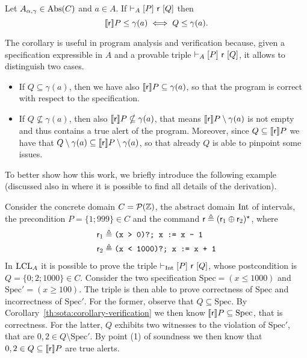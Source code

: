 \begin{corollary}\label{th:sota:corollary-verification}
	Let $A_{\alpha, \gamma} \in \text{\normalfont Abs}(C)$ and $a \in A$. If $\vdash_{A}\nobreak[P]~\mathsf{r}~[Q]$ then
	\[
	\llbracket\mathsf{r}\rrbracket P \le \gamma(a) \iff Q \le \gamma(a) .
	\]
\end{corollary}
The corollary is useful in program analysis and verification because, given a specification expressible in $A$ and a provable triple $\vdash_{A}\nobreak[P]~\mathsf{r}~[Q]$, it allows to distinguish two cases.
\begin{itemize}
	\item If $Q \subseteq \gamma(a)$, then we have also $\llbracket\mathsf{r}\rrbracket P \subseteq \gamma(a)$, so that the program is correct with respect to the specification.
	\item If $Q \nsubseteq \gamma(a)$, then also $\llbracket\mathsf{r}\rrbracket P \nsubseteq \gamma(a)$, that means $\llbracket\mathsf{r}\rrbracket P \setminus \gamma(a)$ is not empty and thus contains a true alert of the program. Moreover, since $Q \subseteq \llbracket\mathsf{r}\rrbracket P$ we have that $Q \setminus \gamma(a) \subseteq \llbracket\mathsf{r}\rrbracket P \setminus \gamma(a)$, so that already $Q$ is able to pinpoint some issues.
\end{itemize}
To better show how this work, we briefly introduce the following example (discussed also in \cite{BGGR21} where it is possible to find all details of the derivation).
\begin{example}
	Consider the concrete domain $C = \mathcal{P}(\mathbb{Z})$, the abstract domain $\text{Int}$ of intervals, the precondition $P = \{ 1; 999 \} \in C$ and the command $\mathsf{r} \triangleq (\mathsf{r}_1 \oplus \mathsf{r}_2)^{\star}$, where
	\begin{align*}
		\mathsf{r}_1 & \triangleq \texttt{(x > 0)?; x := x - 1}    \\
		\mathsf{r}_2 & \triangleq \texttt{(x < 1000)?; x := x + 1}
	\end{align*}
	In $\text{LCL}_A$ it is possible to prove the triple $\vdash_{\text{Int}}\nobreak[P]~\mathsf{r}~[Q]$, whose postcondition is $Q = \{ 0; 2; 1000 \} \in C$. Consider the two specification $\text{Spec}= (x \le 1000)$ and $\text{Spec}' = (x \ge 100)$.
	The triple is then able to prove correctness of $\text{Spec}$ and incorrectness of $\text{Spec}'$.
	For the former, observe that $Q \subseteq \text{Spec}$. By Corollary~\ref{th:sota:corollary-verification} we then know $\llbracket\mathsf{r}\rrbracket P \subseteq \text{Spec}$, that is correctness.
	For the latter, $Q$ exhibits two witnesses to the violation of $\text{Spec}'$, that are $0, 2 \in Q \setminus \text{Spec}'$. By point (1) of soundness we then know that $0, 2 \in Q \subseteq \llbracket\mathsf{r}\rrbracket P$ are true alerts.
\end{example}

